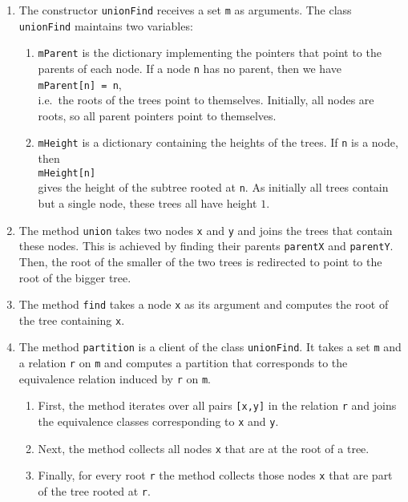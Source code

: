 \begin{enumerate}
\item The constructor \texttt{unionFind} receives a set \texttt{m} as arguments.  The class
      \texttt{unionFind} maintains two variables:
      \begin{enumerate}
      \item \texttt{mParent} is the dictionary implementing the pointers that point to the parents
             of each node.  If a node \texttt{n} has no parent, then we have
             \\[0.2cm]
             \hspace*{1.3cm}
             \texttt{mParent[n] = n},
             \\[0.2cm]
             i.e.~the roots of the trees point to themselves.  Initially, all nodes are roots, so
             all parent pointers point to themselves.
      \item \texttt{mHeight} is a dictionary containing the heights of the trees.  If \texttt{n} is
            a node, then
            \\[0.2cm]
            \hspace*{1.3cm}
            \texttt{mHeight[n]}
            \\[0.2cm]
            gives the height of the subtree rooted at \texttt{n}. As initially all trees contain but
            a single node, these trees all have height $1$.
      \end{enumerate}
\item The method \texttt{union} takes two nodes \texttt{x} and \texttt{y} and joins the trees that
      contain these nodes.  This is achieved by finding their parents \texttt{parentX} and
      \texttt{parentY}.  Then, the root of the smaller of the two trees is redirected to point to
      the root of the bigger tree.
\item The method \texttt{find} takes a node \texttt{x} as its argument and computes the root of the
      tree containing \texttt{x}. 
\item The method \texttt{partition} is a client of the class \texttt{unionFind}.  It takes a set
      \texttt{m} and a relation \texttt{r} on \texttt{m} and computes a partition that corresponds
      to the equivalence relation induced by \texttt{r} on \texttt{m}. 
      \begin{enumerate}
      \item First, the method iterates over all pairs \texttt{[x,y]} in the relation \texttt{r} and
            joins the equivalence classes corresponding to \texttt{x} and \texttt{y}.
      \item Next, the method collects all nodes \texttt{x} that are at the root of a tree.
      \item Finally, for every root \texttt{r} the method collects those nodes \texttt{x} that are
            part of the tree rooted at \texttt{r}.
      \end{enumerate}
\end{enumerate}

